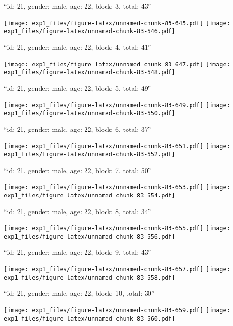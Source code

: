 \documentclass[11pt,,]{article}
\begin{document}
\newpage
[1] 

``id: 21, gender: male, age: 22, block: 3, total: 43''

\texttt{[image: exp1\_files/figure-latex/unnamed-chunk-83-645.pdf]}
\texttt{[image: exp1\_files/figure-latex/unnamed-chunk-83-646.pdf]}

\newpage
[1] 

``id: 21, gender: male, age: 22, block: 4, total: 41''

\texttt{[image: exp1\_files/figure-latex/unnamed-chunk-83-647.pdf]}
\texttt{[image: exp1\_files/figure-latex/unnamed-chunk-83-648.pdf]}

\newpage
[1] 

``id: 21, gender: male, age: 22, block: 5, total: 49''

\texttt{[image: exp1\_files/figure-latex/unnamed-chunk-83-649.pdf]}
\texttt{[image: exp1\_files/figure-latex/unnamed-chunk-83-650.pdf]}

\newpage
[1] 

``id: 21, gender: male, age: 22, block: 6, total: 37''

\texttt{[image: exp1\_files/figure-latex/unnamed-chunk-83-651.pdf]}
\texttt{[image: exp1\_files/figure-latex/unnamed-chunk-83-652.pdf]}

\newpage
[1] 

``id: 21, gender: male, age: 22, block: 7, total: 50''

\texttt{[image: exp1\_files/figure-latex/unnamed-chunk-83-653.pdf]}
\texttt{[image: exp1\_files/figure-latex/unnamed-chunk-83-654.pdf]}

\newpage
[1] 

``id: 21, gender: male, age: 22, block: 8, total: 34''

\texttt{[image: exp1\_files/figure-latex/unnamed-chunk-83-655.pdf]}
\texttt{[image: exp1\_files/figure-latex/unnamed-chunk-83-656.pdf]}

\newpage
[1] 

``id: 21, gender: male, age: 22, block: 9, total: 43''

\texttt{[image: exp1\_files/figure-latex/unnamed-chunk-83-657.pdf]}
\texttt{[image: exp1\_files/figure-latex/unnamed-chunk-83-658.pdf]}

\newpage
[1] 

``id: 21, gender: male, age: 22, block: 10, total: 30''

\texttt{[image: exp1\_files/figure-latex/unnamed-chunk-83-659.pdf]}
\texttt{[image: exp1\_files/figure-latex/unnamed-chunk-83-660.pdf]}
\end{document}
